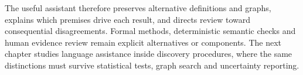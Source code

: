 The useful assistant therefore preserves alternative definitions and graphs,
explains which premises drive each result, and directs review toward
consequential disagreements. Formal methods, deterministic semantic checks and
human evidence review remain explicit alternatives or components. The next
chapter studies language assistance inside discovery procedures, where the
same distinctions must survive statistical tests, graph search and uncertainty
reporting.
\label{exec13:restriction-development-end}
